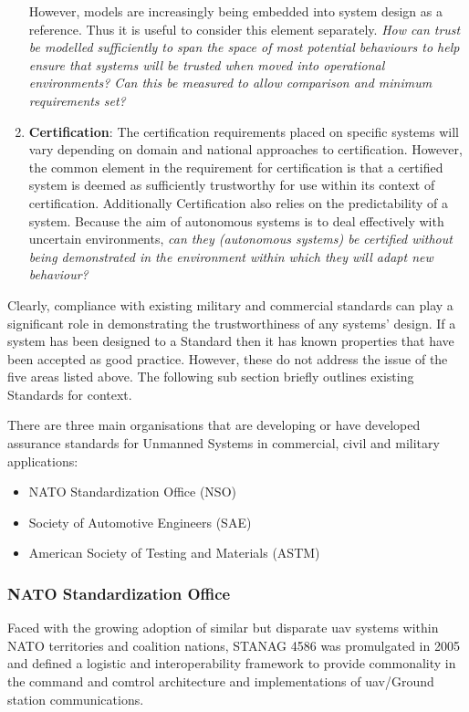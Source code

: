 \begin{enumerate}
    However, models are increasingly being embedded into system design as a reference.
    Thus it is useful to consider this element separately.
    \textit{How can trust be modelled sufficiently to span the space of most potential behaviours to help ensure that systems will be trusted when moved into operational environments?
    Can this be measured to allow comparison and minimum requirements set?}
  \item \textbf{Certification}: The certification requirements placed on specific systems will vary depending on domain and national approaches to certification.
    However, the common element in the requirement for certification is that a certified system is deemed as sufficiently trustworthy for use within its context of certification.
    Additionally Certification also relies on the predictability of a system.
    Because the aim of autonomous systems is to deal effectively with uncertain environments, \textit{can they (autonomous systems) be certified without being demonstrated in the environment within which they will adapt new behaviour?}
\end{enumerate}

Clearly, compliance with existing military and commercial standards can play a significant role in demonstrating the trustworthiness of any systems’ design.
If a system has been designed to a Standard then it has known properties that have been accepted as good practice.
However, these do not address the issue of the five areas listed above.
The following sub section briefly outlines existing Standards for context.

There are three main organisations that are developing or have developed assurance standards for Unmanned Systems in commercial, civil and military applications:
\begin{itemize}
  \item NATO Standardization Office (NSO)
  \item Society of Automotive Engineers (SAE)
  \item American Society of Testing and Materials (ASTM)
\end{itemize}

\subsubsection{NATO Standardization Office}

Faced with the growing adoption of similar but disparate \acrshort{uav} systems within NATO territories and coalition nations, STANAG 4586\cite{STANAG4586} was promulgated in 2005 and defined a logistic and interoperability framework to provide commonality in the command and comtrol architecture and implementations of \acrshort{uav}/Ground station communications.

